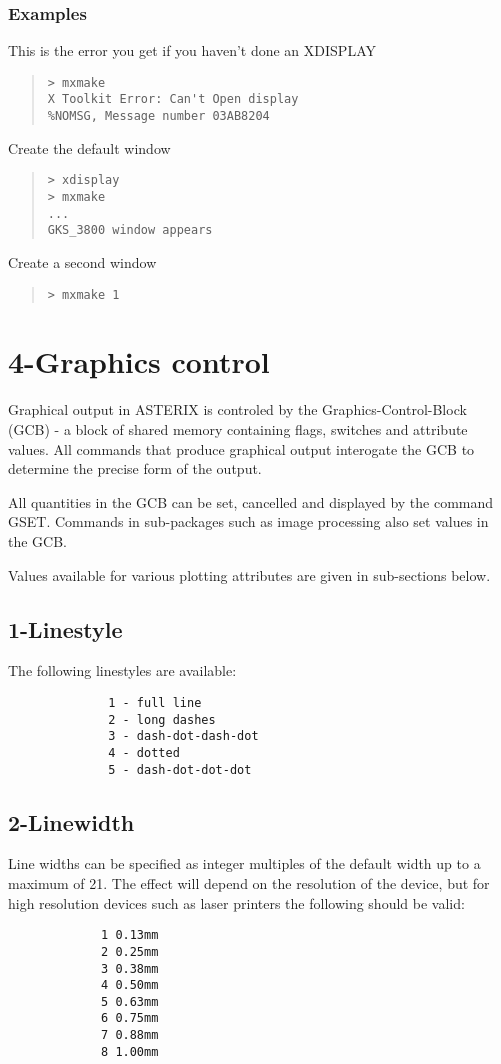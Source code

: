 \documentclass{book}
\renewcommand{\_}{{\tt\char'137}}     %
\begin{document}
\subsubsection{Examples}
This is the error you get if you haven't done an XDISPLAY
\begin{quote}\begin{verbatim}
> mxmake
X Toolkit Error: Can't Open display
%NOMSG, Message number 03AB8204
\end{verbatim}\end{quote}
Create the default window
\begin{quote}\begin{verbatim}
> xdisplay
> mxmake
...
GKS_3800 window appears
\end{verbatim}\end{quote}
Create a second window
\begin{quote}\begin{verbatim}
> mxmake 1
\end{verbatim}\end{quote}
\section{4-Graphics control}
Graphical output in ASTERIX is controled by the Graphics-Control-Block
(GCB) - a block of shared memory containing flags, switches and
attribute values. All commands that produce graphical output
interogate the GCB to determine the precise form of the output.
 
All quantities in the GCB can be set, cancelled and displayed
by the command GSET. Commands in sub-packages such as image
processing also set values in the GCB.
 
Values available for various plotting attributes are given in
sub-sections below.
 
\subsection{1-Linestyle}
The following linestyles are available:
\begin{verbatim}
              1 - full line
              2 - long dashes
              3 - dash-dot-dash-dot
              4 - dotted
              5 - dash-dot-dot-dot
\end{verbatim}
\subsection{2-Linewidth}
Line widths can be specified as integer multiples of the default
width up to a maximum of 21. The effect will depend on the
resolution of the device, but for high resolution devices such
as laser printers the following should be valid:
\begin{verbatim}
             1 0.13mm
             2 0.25mm
             3 0.38mm
             4 0.50mm
             5 0.63mm
             6 0.75mm
             7 0.88mm
             8 1.00mm
\end{verbatim}
\end{document}
